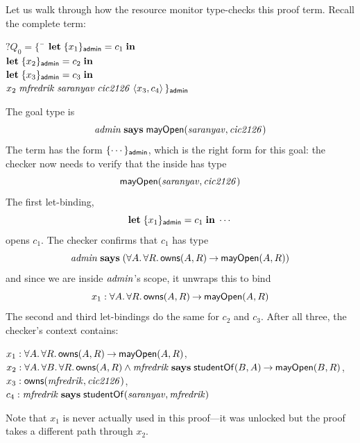 \documentclass[11pt]{article}
\begin{document}
Let us walk through how the resource monitor type-checks this proof term.
Recall the complete term:
\begin{tabbing}
  \qquad ${?}Q_0 = \{\,$ \= $\mathbf{let}\; \{x_1\}_{\mathsf{admin}} = c_1\; \mathbf{in}$ \\
  \> $\mathbf{let}\; \{x_2\}_{\mathsf{admin}} = c_2\; \mathbf{in}$ \\
  \> $\mathbf{let}\; \{x_3\}_{\mathsf{admin}} = c_3\; \mathbf{in}$ \\
  \> $x_2\; \mathit{mfredrik}\; \mathit{saranyav}\; \mathit{cic2126}\; \langle x_3, c_4\rangle\,\}_{\mathsf{admin}}$
\end{tabbing}
The goal type is
\[
  \mathit{admin} \mathrel{\mathbf{says}} \mathsf{mayOpen}(\mathit{saranyav}, \mathit{cic2126})
\]
The term has the form $\{\cdots\}_{\mathsf{admin}}$, which is the right form for
this goal: the checker now needs to verify that the inside has type
\[
  \mathsf{mayOpen}(\mathit{saranyav}, \mathit{cic2126})
\]
The first let-binding,
\[
  \mathbf{let}\; \{x_1\}_{\mathsf{admin}} = c_1\; \mathbf{in}\; \cdots
\]
opens $c_1$.  The checker confirms that $c_1$ has type
\[
  \mathit{admin} \mathrel{\mathbf{says}} (\forall A.\, \forall R.\, \mathsf{owns}(A, R) \mathbin{\rightarrow}
  \mathsf{mayOpen}(A, R))
\]
and since we are inside $\mathit{admin}$'s scope, it unwraps this to bind
\[
  x_1 : \forall A.\, \forall R.\, \mathsf{owns}(A, R) \mathbin{\rightarrow} \mathsf{mayOpen}(A, R)
\]
The second and third let-bindings do the same for $c_2$ and $c_3$.
After all three, the checker's context contains:
\begin{tabbing}
  \quad $x_1 : \forall A.\, \forall R.\, \mathsf{owns}(A, R) \mathbin{\rightarrow} \mathsf{mayOpen}(A, R)$, \\
  \quad $x_2 : \forall A.\, \forall B.\, \forall R.\, \mathsf{owns}(A, R)
  \land \mathit{mfredrik} \mathrel{\mathbf{says}} \mathsf{studentOf}(B, A) \mathbin{\rightarrow} \mathsf{mayOpen}(B, R)$, \\[1ex]
  \quad $x_3 : \mathsf{owns}(\mathit{mfredrik}, \mathit{cic2126})$, \\
  \quad $c_4 : \mathit{mfredrik} \mathrel{\mathbf{says}} \mathsf{studentOf}(\mathit{saranyav}, \mathit{mfredrik})$
\end{tabbing}
Note that $x_1$ is never actually used in this proof---it was unlocked but the
proof takes a different path through $x_2$.
\end{document}
